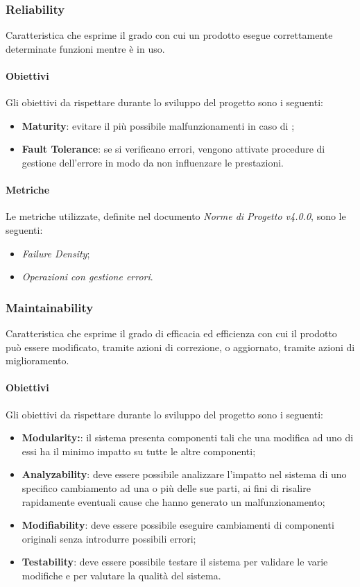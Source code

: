 \subsubsection{Reliability} 
	Caratteristica che esprime il grado con cui un prodotto esegue correttamente determinate funzioni  mentre è in uso.
\paragraph{Obiettivi} \Spazio
Gli obiettivi da rispettare durante lo sviluppo del progetto sono i seguenti:
	\begin{itemize}
		\item{\textbf{Maturity}: evitare il più possibile malfunzionamenti in caso di ;
		}
		\item{\textbf{Fault Tolerance}: se si verificano errori, vengono attivate procedure di gestione dell'errore in modo da non influenzare le prestazioni.
		}
	\end{itemize}

\paragraph{Metriche} \Spazio
Le metriche utilizzate, definite nel documento \emph{Norme di Progetto v4.0.0}, sono le seguenti:
	\begin{itemize}
		\item{\emph{Failure Density};}
		\item{\emph{Operazioni con gestione errori}.}
	\end{itemize}

\subsubsection{Maintainability} 
	Caratteristica che esprime il grado di efficacia ed efficienza con cui il prodotto può essere modificato, tramite azioni di correzione, o aggiornato, tramite azioni di miglioramento.
\paragraph{Obiettivi} \Spazio
Gli obiettivi da rispettare durante lo sviluppo del progetto sono i seguenti:
	\begin{itemize}
		\item{\textbf{Modularity:}: il sistema presenta componenti tali che una modifica ad uno di essi ha il minimo impatto su tutte le altre componenti;
		}
		\item{\textbf{Analyzability}: deve essere possibile analizzare l'impatto nel sistema di uno specifico cambiamento ad una o più delle sue parti, ai fini
		di risalire rapidamente eventuali cause che hanno generato un malfunzionamento;
 		}
		\item{\textbf{Modifiability}: deve essere possibile eseguire cambiamenti di componenti originali senza introdurre possibili errori;
		}
		\item{\textbf{Testability}: deve essere possibile testare il sistema per validare le varie modifiche e per valutare la qualità del sistema.
		}
	\end{itemize}

